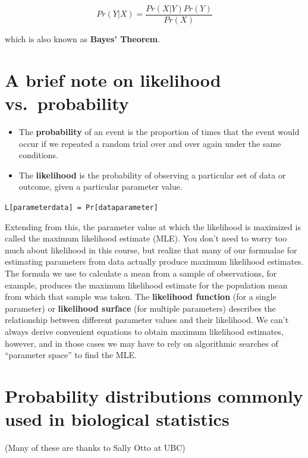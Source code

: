\documentclass[
]{book}
\begin{document}
\[Pr(Y|X) = \frac{Pr(X|Y)Pr(Y)}{Pr(X)}\]

which is also known as \textbf{Bayes' Theorem}.

\hypertarget{a-brief-note-on-likelihood-vs.-probability}{%
\section{A brief note on likelihood vs.~probability}\label{a-brief-note-on-likelihood-vs.-probability}}

\begin{itemize}
\item
  The \textbf{probability} of an event is the proportion of times that the event would occur if we repeated a random trial over and over again under the same conditions.
\item
  The \textbf{likelihood} is the probability of observing a particular set of data or outcome, given a particular parameter value.
\end{itemize}

\texttt{L{[}parameter\textbar{}data{]}\ =\ Pr{[}data\textbar{}parameter{]}}

Extending from this, the parameter value at which the likelihood is maximized is called the maximum likelihood estimate (MLE). You don't need to worry too much about likelihood in this course, but realize that many of our formualae for estimating parameters from data actually produce maximum likelihood estimates. The formula we use to calculate a mean from a sample of observations, for example, produces the maximum likelihood estimate for the population mean from which that sample was taken. The \textbf{likelihood function} (for a single parameter) or \textbf{likelihood surface} (for multiple parameters) describes the relationship between different parameter values and their likelihood. We can't always derive convenient equations to obtain maximum likelihood estimates, however, and in those cases we may have to rely on algorithmic searches of ``parameter space'' to find the MLE.

\hypertarget{probability-distributions-commonly-used-in-biological-statistics}{%
\section{Probability distributions commonly used in biological statistics}\label{probability-distributions-commonly-used-in-biological-statistics}}

(Many of these are thanks to Sally Otto at UBC)
\end{document}
